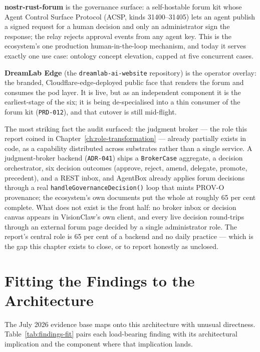 \textbf{nostr-rust-forum} is the governance surface: a self-hostable forum kit whose Agent Control Surface Protocol (ACSP, kinds 31400--31405) lets an agent publish a signed request for a human decision and only an administrator sign the response; the relay rejects approval events from any agent key. This is the ecosystem's one production human-in-the-loop mechanism, and today it serves exactly one use case: ontology concept elevation, capped at five concurrent cases.

\textbf{DreamLab Edge} (the \texttt{dreamlab-ai-website} repository) is the operator overlay: the branded, Cloudflare-edge-deployed public face that renders the forum and consumes the pod layer. It is live, but as an independent component it is the earliest-stage of the six; it is being de-specialised into a thin consumer of the forum kit (\texttt{PRD-012}), and that cutover is still mid-flight.

\begin{keyinsight}[title={The Broker Is Already Half-Built}]
The most striking fact the audit surfaced: the judgment broker --- the role this report coined in Chapter~\ref{ch:role-transformation} --- already partially exists in code, as a capability distributed across substrates rather than a single service. A judgment-broker backend (\texttt{ADR-041}) ships a \texttt{BrokerCase} aggregate, a decision orchestrator, six decision outcomes (approve, reject, amend, delegate, promote, precedent), and a REST inbox, and AgentBox already applies forum decisions through a real \texttt{handleGovernanceDecision()} loop that mints PROV-O provenance; the ecosystem's own documents put the whole at roughly 65 per cent complete. What does not exist is the front half: no broker inbox or decision canvas appears in VisionClaw's own client, and every live decision round-trips through an external forum page decided by a single administrator role. The report's central role is 65 per cent of a backend and no daily practice --- which is the gap this chapter exists to close, or to report honestly as unclosed.
\end{keyinsight}

\section{Fitting the Findings to the Architecture}

The July 2026 evidence base maps onto this architecture with unusual directness. Table~\ref{tab:findings-fit} pairs each load-bearing finding with its architectural implication and the component where that implication lands.

